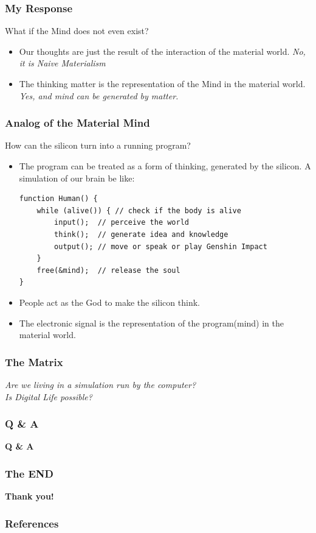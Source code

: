 \documentclass{beamer}
\begin{document}
\begin{frame}
    \frametitle{My Response}
    What if the Mind does not even exist?
    \begin{itemize}
        \item<2-> Our thoughts are just the result of the interaction of the material world. \emph{No, it is Naive Materialism}
        \item<3-> The thinking matter is the representation of the Mind in the material world. \emph{Yes, and mind can be generated by matter.}
    \end{itemize}
\end{frame}

\begin{frame}[fragile]
    \frametitle{Analog of the Material Mind}
    How can the silicon turn into a running program?
    \begin{itemize}
        \item The program can be treated as a form of thinking, generated by the silicon. A simulation of our brain be like:
            \begin{lstlisting}
function Human() {
    while (alive()) { // check if the body is alive
        input();  // perceive the world
        think();  // generate idea and knowledge
        output(); // move or speak or play Genshin Impact
    }
    free(&mind);  // release the soul
}
            \end{lstlisting}
        \item<2-> People act as the God to make the silicon think.
        \item<3-> The electronic signal is the representation of the program(mind) in the material world.
    \end{itemize}
\end{frame}

\begin{frame}
    \frametitle{The Matrix}
    \centering
    {\large \emph{ Are we living in a simulation run by the computer? \\ Is Digital Life possible?}}
\end{frame}

\begin{frame}
    \frametitle{Q \& A}
    {\Huge \textbf{Q \& A}}
\end{frame}

\begin{frame}
    \frametitle{The END}
    \centering
    {\Huge \textbf{Thank you!}}
\end{frame}

\begin{frame}
    \frametitle{References}
    \printbibliography
\end{frame}
\end{document}
